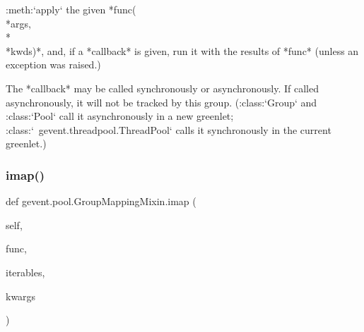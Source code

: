 \begin{DoxyVerb}:meth:`apply` the given *func(\\*args, \\*\\*kwds)*, and, if a *callback* is given, run it with the
results of *func* (unless an exception was raised.)

The *callback* may be called synchronously or asynchronously. If called
asynchronously, it will not be tracked by this group. (:class:`Group` and :class:`Pool`
call it asynchronously in a new greenlet; :class:`~gevent.threadpool.ThreadPool` calls
it synchronously in the current greenlet.)
\end{DoxyVerb}
 \mbox{\label{classgevent_1_1pool_1_1_group_mapping_mixin_a0c1b1d6ed667a020a99cc9c86fadf785}} 
\subsubsection{\texorpdfstring{imap()}{imap()}}
{\footnotesize\ttfamily def gevent.\+pool.\+Group\+Mapping\+Mixin.\+imap (\begin{DoxyParamCaption}\item[{}]{self,  }\item[{}]{func,  }\item[{}]{iterables,  }\item[{}]{kwargs }\end{DoxyParamCaption})}


